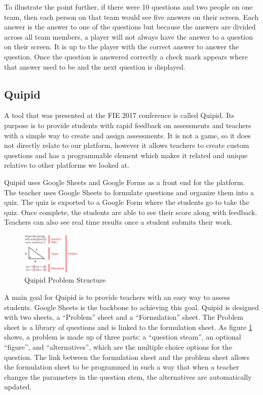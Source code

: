 \documentclass{article}
\begin{document}
To illustrate the point further, if there were 10 questions and two people on one team, then each person on that team would see five answers on their screen. Each answer is the answer to one of the questions but because the answers are divided across all team members, a player will not always have the answer to a question on their screen. It is up to the player with the correct answer to answer the question. Once the question is answered correctly a check mark appears where that answer used to be and the next question is displayed.

\subsection{Quipid}
A tool that was presented at the FIE 2017 conference is called Quipid. Its purpose is to provide students with rapid feedback on assessments and teachers with a simple way to create and assign assessments. It is not a game, so it does not directly relate to our platform, however it allows teachers to create custom questions and has a programmable element which makes it related and unique relative to other platforms we looked at.
\smallskip

Quipid uses Google Sheets and Google Forms as a front end for the platform. The teacher uses Google Sheets to formulate questions and organize them into a quiz. The quiz is exported to a Google Form where the students go to take the quiz. Once complete, the students are able to see their score along with feedback. Teachers can also see real time results once a student submits their work.
\smallskip
\begin{figure}
    \centering
    \includegraphics[width=0.25\textwidth]{images/quipid-problem.png}
    \caption{Quipid Problem Structure \cite{quipid}}
    \label{fig:quipid-problem}
\end{figure}
\indent A main goal for Quipid is to provide teachers with an easy way to assess students. Google Sheets is the backbone to achieving this goal. Quipid is designed with two sheets, a ``Problem'' sheet and a ``Formulation'' sheet. The Problem sheet is a library of questions and is linked to the formulation sheet. As figure \ref{fig:quipid-problem} shows, a problem is made up of three parts: a ``question steam'', an optional ``figure'', and ``alternatives'', which are the multiple choice options for the question. The link between the formulation sheet and the problem sheet allows the formulation sheet to be programmed in such a way that when a teacher changes the parameters in the question stem, the alternatives are automatically updated.
\smallskip
\end{document}
